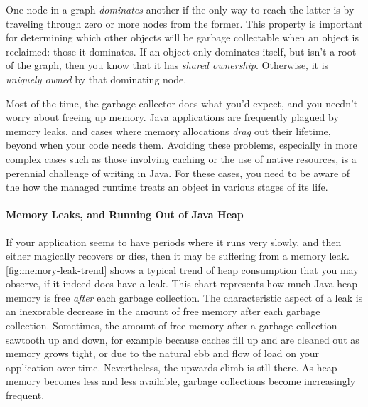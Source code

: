  {
\label{sec:dominance} One node in a graph \emph{dominates}
another if the only way to reach the latter is by traveling through zero or more
nodes from the former.
This property is important for determining which other objects will be garbage
collectable when an object is reclaimed: those it dominates. If an object only
dominates itself, but isn't a root of the graph, then you know that it has
\emph{shared ownership}. Otherwise, it is
\emph{uniquely owned} by that dominating node.}

Most of the time, the garbage collector does what you'd expect, and you needn't
worry about freeing up memory. Java applications are frequently plagued by
memory leaks, and cases where memory allocations \emph{drag} out their lifetime,
beyond when your code needs them. Avoiding these problems, especially in more
complex cases such as those involving caching or the use of native resources, is
a perennial challenge of writing in Java. For these cases, you need to be aware
of the how the managed runtime treats an object in various stages of its life.

\paragraph{Memory Leaks, and Running Out of Java Heap}
\label{sec:memory-leaks}

If your application seems to have periods where it runs very slowly, and then
either magically recovers or dies, then it may be suffering from a memory leak.
\autoref{fig:memory-leak-trend} shows a typical trend of heap consumption that
you may observe, if it indeed does have a leak. This chart represents how much
Java heap memory is free \emph{after} each garbage collection. The
characteristic aspect of a leak is an inexorable decrease in the amount of free
memory after each garbage collection. Sometimes, the amount of free memory after
a garbage collection sawtooth up and down, for example because caches fill up
and are cleaned out as memory grows tight, or due to the natural ebb and flow of
load on your application over time. Nevertheless, the upwards climb is stll
there. As heap memory becomes less and less available, garbage collections
become increasingly frequent.



